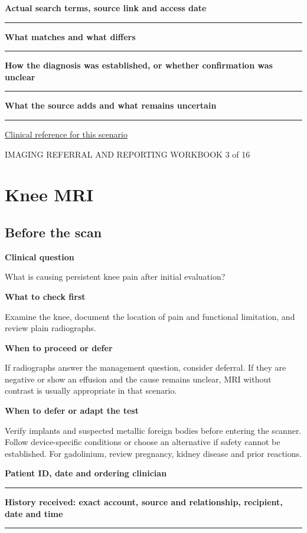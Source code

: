 \documentclass[11pt,a4paper]{article}
\newcommand{\record}[1]{\textbf{#1}\par\vspace{0.55\baselineskip}\hrule\vspace{0.35\baselineskip}}
\begin{document}
\record{Actual search terms, source link and access date}

\record{What matches and what differs}

\record{How the diagnosis was established, or whether confirmation was unclear}

\record{What the source adds and what remains uncertain}

\small\href{https://acsearch.acr.org/docs/69481/Narrative}{Clinical reference for this scenario}

\normalsize

\newpage

{\small IMAGING REFERRAL AND REPORTING WORKBOOK \hfill 3 of 16}

\section*{Knee MRI}

\subsection*{Before the scan}

\textbf{Clinical question}\par What is causing persistent knee pain after initial evaluation?\par

\textbf{What to check first}\par Examine the knee, document the location of pain and functional limitation, and review plain radiographs.\par

\textbf{When to proceed or defer}\par If radiographs answer the management question, consider deferral. If they are negative or show an effusion and the cause remains unclear, MRI without contrast is usually appropriate in that scenario.\par

\textbf{When to defer or adapt the test}\par Verify implants and suspected metallic foreign bodies before entering the scanner. Follow device-specific conditions or choose an alternative if safety cannot be established. For gadolinium, review pregnancy, kidney disease and prior reactions.\par

\record{Patient ID, date and ordering clinician}

\record{History received: exact account, source and relationship, recipient, date and time}
\end{document}
